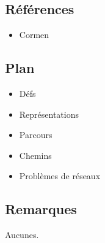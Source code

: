 \documentclass[../../Agregation.tex]{subfiles}
\begin{document}

\dvts

\subsection{Références}

\begin{itemize}
	\item Cormen
	
\end{itemize}

\subsection{Plan}

\begin{itemize}
	\item Défs
	\item Représentations
	\item Parcours
	\item Chemins
	\item Problèmes de réseaux
\end{itemize}

\subsection{Remarques}

Aucunes.
\end{document}
